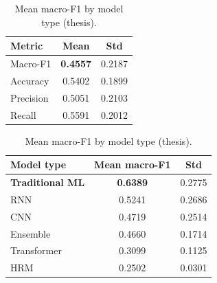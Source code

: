 \begin{table}[t]
  \begin{minipage}[t]{0.48\textwidth}
    \centering
    \caption{Global statistics (thesis-scale aggregate).}
    \label{tab:global_stats}
    \begin{tabular*}{\linewidth}{@{\extracolsep{\fill}}lcc@{}}
      \toprule
      Metric & Mean & Std \\
      \midrule
      Macro-F1 & \textbf{0.4557} & 0.2187 \\
      Accuracy & 0.5402 & 0.1899 \\
      Precision & 0.5051 & 0.2103 \\
      Recall & 0.5591 & 0.2012 \\
      \bottomrule
    \end{tabular*}
  \end{minipage}\hfill
  \begin{minipage}[t]{0.48\textwidth}
    \centering
    \caption{Mean macro-F1 by model type (thesis).}
    \label{tab:by_type}
    \begin{tabular*}{\linewidth}{@{\extracolsep{\fill}}lcc@{}}
      \toprule
      Model type & Mean macro-F1 & Std \\
      \midrule
      \textbf{Traditional ML} & \textbf{0.6389} & 0.2775 \\
      RNN & 0.5241 & 0.2686 \\
      CNN & 0.4719 & 0.2514 \\
      Ensemble & 0.4660 & 0.1714 \\
      Transformer & 0.3099 & 0.1125 \\
      HRM & 0.2502 & 0.0301 \\
      \bottomrule
    \end{tabular*}
  \end{minipage}
  
  \vspace{1.5em}
  

\end{table}
